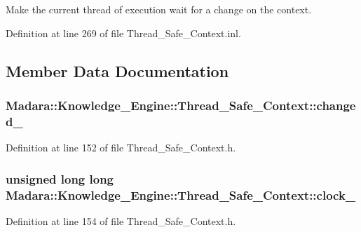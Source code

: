 Make the current thread of execution wait for a change on the context. 



Definition at line 269 of file Thread\_\-Safe\_\-Context.inl.



\subsection{Member Data Documentation}
\hypertarget{classMadara_1_1Knowledge__Engine_1_1Thread__Safe__Context_ae5f55e8a134860c3e71fb4bbef3d5418}{
\subsubsection[{changed\_\-}]{ {\bf Madara::Knowledge\_\-Engine::Thread\_\-Safe\_\-Context::changed\_\-}}}
\label{d4/da3/classMadara_1_1Knowledge__Engine_1_1Thread__Safe__Context_ae5f55e8a134860c3e71fb4bbef3d5418}


Definition at line 152 of file Thread\_\-Safe\_\-Context.h.

\hypertarget{classMadara_1_1Knowledge__Engine_1_1Thread__Safe__Context_ae16c3d6186939bca49989c8c31262861}{
\subsubsection[{clock\_\-}]{\setlength{\rightskip}{0pt plus 5cm}unsigned long long {\bf Madara::Knowledge\_\-Engine::Thread\_\-Safe\_\-Context::clock\_\-}}}
\label{d4/da3/classMadara_1_1Knowledge__Engine_1_1Thread__Safe__Context_ae16c3d6186939bca49989c8c31262861}


Definition at line 154 of file Thread\_\-Safe\_\-Context.h.


